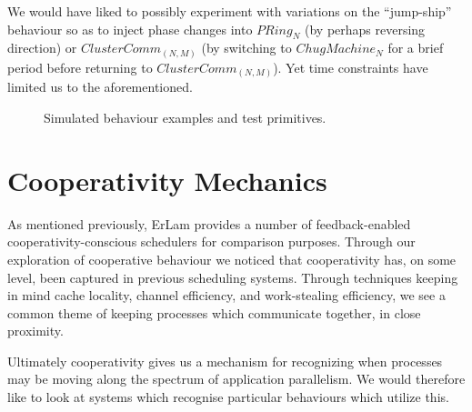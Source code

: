 We would have liked to possibly experiment with variations on the ``jump-ship''
behaviour so as to inject phase changes into $PRing_N$ (by perhaps reversing
direction) or $ClusterComm_{(N,M)}$ (by switching to $ChugMachine_N$ for a 
brief period before returning to $ClusterComm_{(N,M)}$). Yet time constraints
have limited us to the aforementioned.

\begin{figure}
\hfill
{}

\hfill
{}

\hfill
{}
\caption{Simulated behaviour examples and test primitives.}
\end{figure}


\section{Cooperativity Mechanics}\label{sec:cooperativity mechanics}

As mentioned previously, ErLam provides a number of feedback-enabled 
cooperativity-conscious schedulers for comparison purposes. Through our 
exploration of cooperative behaviour we noticed that
cooperativity has, on some level, been captured in previous scheduling systems.
Through techniques keeping in mind cache locality, channel efficiency,
and work-stealing efficiency, we see a common theme of keeping processes which
communicate together, in close proximity. 

Ultimately cooperativity gives us a mechanism for recognizing when processes 
may be moving along the spectrum of application parallelism. We would therefore 
like to look at systems which recognise particular behaviours which utilize this.

